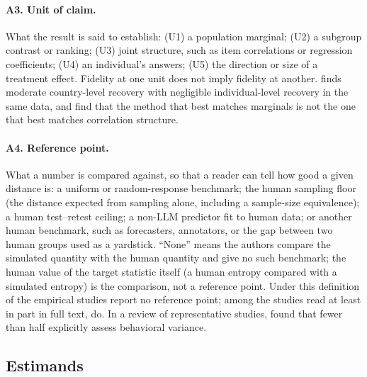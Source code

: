 \documentclass[11pt]{article}
\begin{document}
\paragraph{A3. Unit of claim.} What the result is said to establish: (U1) a population marginal; (U2) a subgroup contrast or ranking; (U3) joint structure, such as item correlations or regression coefficients; (U4) an individual's answers; (U5) the direction or size of a treatment effect. Fidelity at one unit does not imply fidelity at another. \citet{wang2026ess} finds moderate country-level recovery with negligible individual-level recovery in the same data, and \citet{williams2026beyond} find that the method that best matches marginals is not the one that best matches correlation structure.

\paragraph{A4. Reference point.} What a number is compared against, so that a reader can tell how good a given distance is: a uniform or random-response benchmark; the human sampling floor (the distance expected from sampling alone, including a sample-size equivalence); a human test--retest ceiling; a non-LLM predictor fit to human data; or another human benchmark, such as forecasters, annotators, or the gap between two human groups used as a yardstick. ``None'' means the authors compare the simulated quantity with the human quantity and give no such benchmark; the human value of the target statistic itself (a human entropy compared with a simulated entropy) is the comparison, not a reference point. Under this definition \cNone{} of the \cEmp{} empirical studies report no reference point; among the \cReadOK{} studies read at least in part in full text, \cNoneReadOK{} do. In a review of representative studies, \citet{wu2025boundary} found that fewer than half explicitly assess behavioral variance.

\subsection{Estimands}
\label{sec:estimands}
\end{document}
